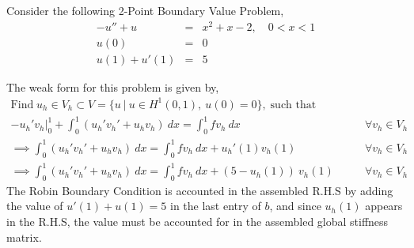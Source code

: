 \begin{example}
	Consider the following 2-Point Boundary Value Problem,
	\begin{eqnarray}
	-u'' + u &=& x^2+x-2, \quad 0<x<1\\
	u(0) &=& 0\\
	u(1)+u'(1) &=& 5
	\end{eqnarray}
	
	The weak form for this problem is given by,
	\begin{eqnarray}\nonumber
	\text{Find} \; u_h \in V_h \subset V = \{u \ | \ u \in H^1(0,1), \ u(0) = 0\}, \; \text{such that} \\\nonumber
	- u_h'v_h \Big|_0^1 + \int_{0}^{1} (u_h' v_h' + u_h v_h) \ dx = \int_{0}^{1} f v_h \ dx \qquad &\forall v_h \in V_h&	\\
	\implies \int_{0}^{1} (u_h' v_h' + u_h v_h) \ dx = \int_{0}^{1} f v_h \ dx  + u_h'(1)v_h(1)\qquad &\forall v_h \in V_h&\\
	\implies \int_{0}^{1} (u_h' v_h' + u_h v_h) \ dx = \int_{0}^{1} f v_h \ dx  + (5 - u_h(1)) \ v_h(1)\qquad &\forall v_h \in V_h&
	\end{eqnarray}	
	The Robin Boundary Condition is accounted in the assembled R.H.S by adding the value of $u'(1)+u(1) = 5$ in the last entry of $b$, and since $u_h(1)$ appears in the R.H.S, the value must be accounted for in the assembled global stiffness matrix.\\
	

\end{example}
